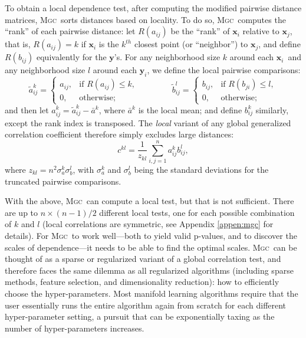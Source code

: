 \documentclass[11pt]{article}
\providecommand{\sct}[1]{{\normalfont\textsc{#1}}}
\providecommand{\mt}[1]{\widetilde{#1}}
\providecommand{\mb}[1]{\boldsymbol{#1}}
\newcommand{\G}{c}
\newcommand{\Mgc}{\sct{Mgc}}
\newcommand{\mby}{\ensuremath{\mb{y}}}
\begin{document}
To obtain a local dependence test, after computing the modified pairwise distance matrices, \Mgc~sorts distances based on locality.
To do so, \Mgc~computes the ``rank'' of each pairwise distance: 
let $R(a_{ij})$  be the ``rank'' of $\mb{x}_i$ relative to $\mb{x}_j$, that is, $R(a_{ij})=k$ if $\mb{x}_i$ is the $k^{th}$ closest point (or ``neighbor'') to $\mb{x}_j$, and define $R(b_{ij})$ equivalently for the \mby's. For any neighborhood size $k$ around each $\mb{x}_i$~and any neighborhood size $l$ around each $\mb{y}_i$, we define the local pairwise comparisons:
\begin{equation}
\label{localCoef2}
    \mt{a}_{ij}^k=
    \begin{cases}
      a_{ij}, & \text{if } R(a_{ij}) \leq k, \\
      0, & \text{otherwise};
    \end{cases} \qquad \qquad
    \mt{b}_{ij}^l=
    \begin{cases}
      b_{ij}, & \text{if } R(b_{ji}) \leq l, \\
      0, & \text{otherwise};
    \end{cases}
\end{equation}
and then let $a^k_{ij}=\mt{a}^k_{ij} - \bar{a}^k$, 
where $\bar{a}^k$ is the local mean;
and define $b^k_{ij}$ similarly, except the rank index is transposed. 
The \emph{local} variant of any global generalized correlation coefficient therefore simply excludes large distances: %
\begin{equation}
\label{localCoef}
\G^{kl}=\dfrac{1}{z_{kl}} {\textstyle \sum_{i,j=1}^n a_{ij}^k b_{ij}^l},
\end{equation}
where $z_{kl}=n^2 \sigma_a^k \sigma_b^l$,  with $\sigma_a^k$ and $\sigma_b^{l}$ being the standard deviations for the truncated pairwise comparisons. 


With the above, \Mgc~can compute a local test, but that is not sufficient.  There are up to $n \times (n-1)/2$ different local tests, one for each possible combination of $k$ and $l$ (local correlations are symmetric, see Appendix \ref{appen:mgc} for details).  For \Mgc~to work well---both to yield valid p-values, and to discover the scales of dependence---it needs to be able to find the optimal scales.  
\Mgc~can be thought of as a sparse or regularized variant of a global correlation test, and therefore faces the same dilemma as all regularized algorithms (including sparse methods, feature selection, and dimensionality reduction): how to efficiently choose the hyper-parameters.
Most manifold learning algorithms require that the user essentially runs the entire algorithm again from scratch for each different hyper-parameter setting, a pursuit that can be exponentially taxing as the number of hyper-parameters increases.  
\end{document}
